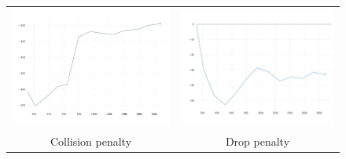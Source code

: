 \documentclass{beamer}
\begin{document}
\begin{frame}
\begin{figure}
\begin{tabular}{cc}
				\includegraphics[scale=0.15]{graph-collision-penalty.jpeg} & \includegraphics[scale=0.15]{graph-drop-penalty.jpeg} \\
				{\small Collision penalty} & {\small Drop penalty} \\
			\end{tabular}
		\end{figure}
	\end{frame}
\end{document}
